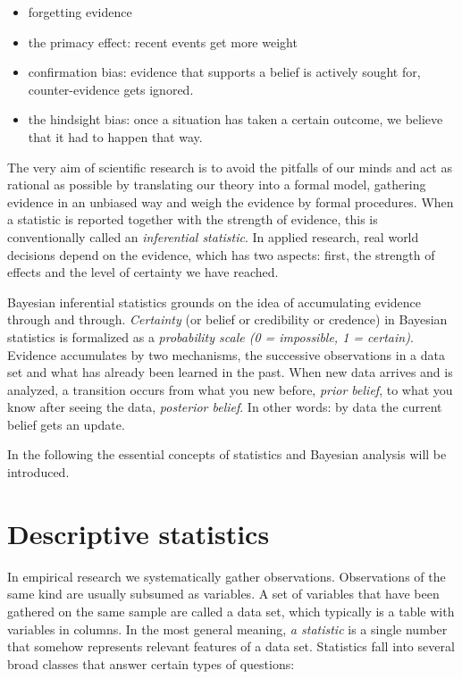 \documentclass[]{svmono}
\providecommand{\tightlist}{%
  \setlength{\itemsep}{0pt}\setlength{\parskip}{0pt}}
\begin{document}
\begin{itemize}
\tightlist
\item
  forgetting evidence
\item
  the primacy effect: recent events get more weight
\item
  confirmation bias: evidence that supports a belief is actively sought
  for, counter-evidence gets ignored.
\item
  the hindsight bias: once a situation has taken a certain outcome, we
  believe that it had to happen that way.
\end{itemize}

The very aim of scientific research is to avoid the pitfalls of our
minds and act as rational as possible by translating our theory into a
formal model, gathering evidence in an unbiased way and weigh the
evidence by formal procedures. When a statistic is reported together
with the strength of evidence, this is conventionally called an
\emph{inferential statistic}. In applied research, real world decisions
depend on the evidence, which has two aspects: first, the strength of
effects and the level of certainty we have reached.

Bayesian inferential statistics grounds on the idea of accumulating
evidence through and through. \emph{Certainty} (or belief or credibility
or credence) in Bayesian statistics is formalized as a \emph{probability
scale (0 = impossible, 1 = certain)}. Evidence accumulates by two
mechanisms, the successive observations in a data set and what has
already been learned in the past. When new data arrives and is analyzed,
a transition occurs from what you new before, \emph{prior belief}, to
what you know after seeing the data, \emph{posterior belief}. In other
words: by data the current belief gets an update.

In the following the essential concepts of statistics and Bayesian
analysis will be introduced.

\section{Descriptive statistics}\label{descriptive_stats}

In empirical research we systematically gather observations.
Observations of the same kind are usually subsumed as variables. A set
of variables that have been gathered on the same sample are called a
data set, which typically is a table with variables in columns. In the
most general meaning, \emph{a statistic} is a single number that somehow
represents relevant features of a data set. Statistics fall into several
broad classes that answer certain types of questions:
\end{document}
